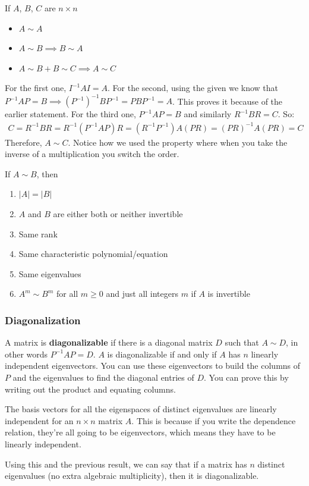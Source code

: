 \documentclass{article}
\begin{document}
If $A$, $B$, $C$ are $n \times n$
\begin{itemize}
    \item $A \sim A$
    \item $A \sim B \implies B \sim A$
    \item $A \sim B + B \sim C \implies A \sim C$
\end{itemize}
For the first one, $I^{-1}AI = A$. For the second, using the given we know that $P^{-1}AP = B \implies (P^{-1})^{-1}BP^{-1} = PBP^{-1} = A$. This proves it because of the earlier statement. For the third one, $P^{-1}AP = B$ and similarly $R^{-1}BR = C$. So:
\begin{gather*}
    C = R^{-1}BR = R^{-1}(P^{-1}AP)R = (R^{-1}P^{-1})A(PR) = (PR)^{-1}A(PR) = C
\end{gather*}
Therefore, $A \sim C$. Notice how we used the property where when you take the inverse of a multiplication you switch the order.

If $A \sim B$, then
\begin{enumerate}
    \item $|A| = |B|$
    \item $A$ and $B$ are either both or neither invertible
    \item Same rank
    \item Same characteristic polynomial/equation
    \item Same eigenvalues
    \item $A^m \sim B^m$ for all $m \geqslant 0$ and just all integers $m$ if $A$ is invertible
\end{enumerate}
\subsubsection{Diagonalization}
A matrix is \textbf{diagonalizable} if there is a diagonal matrix $D$ such that $A \sim D$, in other words $P^{-1}AP = D$. $A$ is diagonalizable if and only if $A$ has $n$ linearly independent eigenvectors. You can use these eigenvectors to build the columns of $P$ and the eigenvalues to find the diagonal entries of $D$. You can prove this by writing out the product and equating columns.

The basis vectors for all the eigenspaces of distinct eigenvalues are linearly independent for an $n \times n$ matrix $A$. This is because if you write the dependence relation, they're all going to be eigenvectors, which means they have to be linearly independent.

Using this and the previous result, we can say that if a matrix has $n$ distinct eigenvalues (no extra algebraic multiplicity), then it is diagonalizable.
\end{document}

